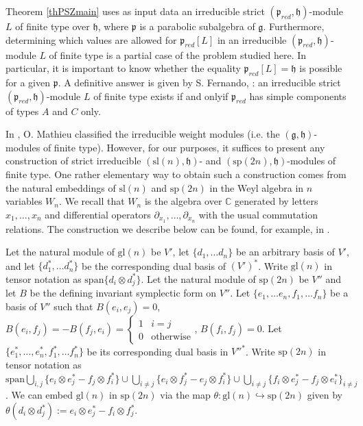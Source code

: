 \documentclass[12pt]{report}
\newcommand {\CC} {\mathbb {C}}
\newcommand{\hh}{\mathfrak{h}}
\newcommand{\pp}{\mathfrak{p}}
\newcommand{\gG}{\mathfrak{g}}
\newcommand{\doublebrace}[4]{\left\{\begin{array}{ll}#1 & #2 \\ #3 & #4\end{array}\right.}
\newcommand{\sL}{\mathrm{sl}}
\newcommand{\sP}{\mathrm{sp}}
\newcommand{\linspan}{\mathrm{span}}
\newcommand{\gl}{\mathrm{gl}}
\begin{document}
Theorem \ref{thPSZmain} uses as input data an irreducible strict $(\pp_{red},\hh)$-module $L$ of finite type over $\hh$, where $\pp$ is a parabolic subalgebra of $\gG$. Furthermore, determining which values are allowed for $\pp_{red}[L]$ in an irreducible $(\pp_{red},\hh)$-module $L$ of finite type is a partial case of the problem studied here. In particular, it is important to know whether the equality $\pp_{red}[L]=\hh$ is possible for a given $\pp$. A definitive answer is given by S. Fernando, \cite[Theorem 5.2]{Fernando1}: an irreducible strict $(\pp_{red},\hh)$-module $L$ of finite type exists if and onlyif $\pp_{red}$ has simple components of types $A$ and $C$ only. 

In \cite{Mathieu}, O. Mathieu classified the irreducible weight modules (i.e. the $(\gG,\hh)$-modules of finite type). However, for our purposes, it suffices to present any construction of strict irreducible $(\sL(n),\hh)$- and $(\sP(2n),\hh)$-modules of finite type. One rather elementary way to obtain such a construction comes from the natural embeddings of $\sL(n)$ and $\sP(2n)$ in the Weyl algebra in $n$ variables $W_n$. We recall that $W_n$ is the algebra over $\CC$ generated by letters $x_1,\dots, x_n$ and differential operators $ \partial_{x_1},\dots,\partial_{x_n}$ with the usual commutation relations. The construction we describe below can be found, for example, in \cite{BrittenLemire}.

Let the natural module of $\gl(n)$ be $V'$, let $\{d_1,\dots d_n\}$ be an arbitrary basis of $V'$, and let $\{d_1^*,\dots d_n^*\}$ be the corresponding dual basis of $(V')^*$. Write $\gl(n)$ in tensor notation as $\linspan\{d_i\otimes d_j^* \} $. Let the natural module of $\sP(2n)$ be $V''$ and let $B$ be the defining invariant symplectic form on $V''$. Let $\{e_1,\dots e_n, f_1, \dots f_n\}$ be a basis of $V''$ such that $B(e_i, e_j)=0$, $B(e_i,f_j)= -B(f_j,e_i) =\doublebrace{1 }{i=j}{0}{\mathrm{otherwise}}$, $B(f_i,f_j)=0$. Let $\{e_1^*,\dots, e_n^*, f_1^*,\dots f_n^* \}$ be its corresponding dual basis in ${V''}^*$.  Write $\sP(2n)$ in tensor notation as $\linspan\bigcup_{i,j} \{e_i \otimes e_j^*-f_j\otimes f_i^*\}\cup \bigcup_{i\neq j}\{e_i\otimes f_j^*- e_j\otimes f_i^*\}\cup \bigcup_{i\neq j}\{f_i\otimes e_j^*- f_j\otimes e_i^*\}_{i\neq j} $. We can embed $\gl(n)$ in $\sP(2n)$ via the map $\theta: \gl(n) \hookrightarrow \sP(2n)$ given by $\theta( d_i\otimes d_j^*):=e_i\otimes e_j^* - f_i\otimes f_j^* $. 
\end{document}

